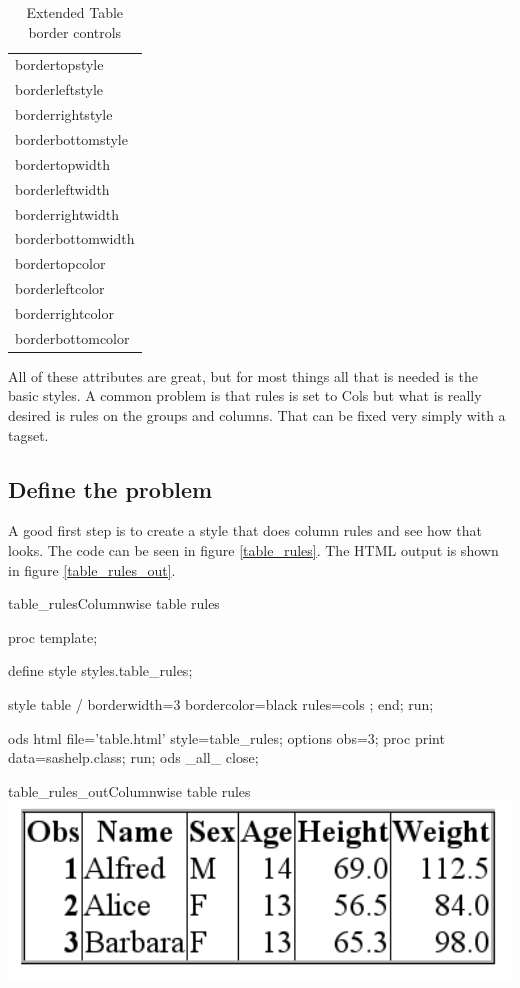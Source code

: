 \begin{table}\caption{Extended Table border controls}
\label{table_attribute rules2}
\begin{tabular}{l} \\ \hline
bordertopstyle  \\
borderleftstyle  \\
borderrightstyle  \\
borderbottomstyle  \\ \hline
bordertopwidth  \\
borderleftwidth  \\
borderrightwidth  \\
borderbottomwidth \\ \hline
bordertopcolor  \\
borderleftcolor  \\
borderrightcolor  \\
borderbottomcolor  
\end{tabular}
\end{table}

All of these attributes are great, but for most things all that is needed is the basic
styles.  A common problem is that rules is set to Cols but what is really desired
is rules on the groups and columns.  That can be fixed very simply with a tagset.

\subsection{Define the problem}
A good first step is to create a style that does column rules and see how that looks.  The
code can be seen in figure \vref{table_rules}. The HTML output is shown in 
figure \vref{table_rules_out}.

\begin{fvcode}{table_rules}{Columnwise table rules}

proc template;

    define style styles.table_rules;

        style table /
          borderwidth=3
          bordercolor=black
          rules=cols
        ;
     end;
run;

ods html file='table.html' style=table_rules;
options obs=3;
proc print data=sashelp.class; run;
ods _all_ close;
\end{fvcode}

\begin{goutput}{table_rules_out}{Columnwise table rules}
\includegraphics[width=6in]{table_rules.png}
\end{goutput}

